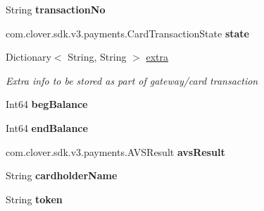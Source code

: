 \begin{DoxyCompactItemize}
String {\bfseries transaction\+No}
\item 
\mbox{\label{classcom_1_1clover_1_1sdk_1_1v3_1_1payments_1_1_card_transaction_aab36d155d0fca4cb28f041727fffc9b1}} 
com.\+clover.\+sdk.\+v3.\+payments.\+Card\+Transaction\+State {\bfseries state}
\item 
Dictionary$<$ String, String $>$ \hyperlink{classcom_1_1clover_1_1sdk_1_1v3_1_1payments_1_1_card_transaction_a6303e2e34aa968eaed5a608fbc5cde24}{extra}
\begin{DoxyCompactList}\small\item\em Extra info to be stored as part of gateway/card transaction \end{DoxyCompactList}\item 
\mbox{\label{classcom_1_1clover_1_1sdk_1_1v3_1_1payments_1_1_card_transaction_a6bd82b66a58cbddd8c7de8f3ccc0088e}} 
Int64 {\bfseries beg\+Balance}
\item 
\mbox{\label{classcom_1_1clover_1_1sdk_1_1v3_1_1payments_1_1_card_transaction_a10611fe7fe1f7e993f772f20c567b944}} 
Int64 {\bfseries end\+Balance}
\item 
\mbox{\label{classcom_1_1clover_1_1sdk_1_1v3_1_1payments_1_1_card_transaction_ae41fa01597fe6371d4af82646b3310ee}} 
com.\+clover.\+sdk.\+v3.\+payments.\+A\+V\+S\+Result {\bfseries avs\+Result}
\item 
\mbox{\label{classcom_1_1clover_1_1sdk_1_1v3_1_1payments_1_1_card_transaction_a9f3250f54863da2de849237e218a023f}} 
String {\bfseries cardholder\+Name}
\item 
\mbox{\label{classcom_1_1clover_1_1sdk_1_1v3_1_1payments_1_1_card_transaction_a7dabfba833640e78d38a60dab107bf55}} 
String {\bfseries token}
\end{DoxyCompactItemize}


